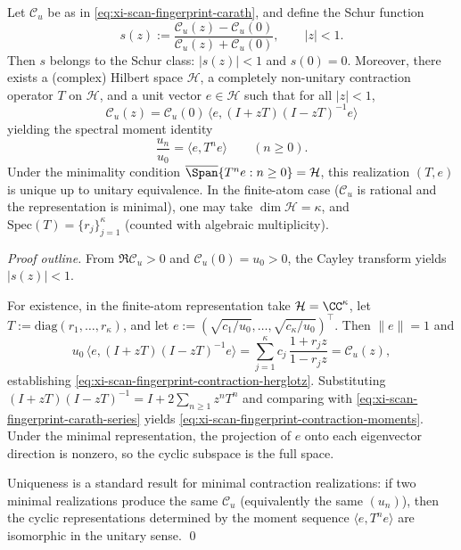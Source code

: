 \begin{proposition}\label{prop:xi-scan-fingerprint-minimal-contraction-realization}
Let \(\mathscr{C}_u\) be as in \eqref{eq:xi-scan-fingerprint-carath}, and define the Schur function
\[
s(z):=\frac{\mathscr{C}_u(z)-\mathscr{C}_u(0)}{\mathscr{C}_u(z)+\mathscr{C}_u(0)},
\qquad |z|<1.
\]
Then \(s\) belongs to the Schur class: \(|s(z)|<1\) and \(s(0)=0\).
Moreover, there exists a (complex) Hilbert space \(\mathcal{H}\), a completely non-unitary contraction operator \(T\) on \(\mathcal{H}\), and a unit vector \(e\in\mathcal{H}\) such that for all \(|z|<1\),
\begin{equation}\label{eq:xi-scan-fingerprint-contraction-herglotz}
\boxed{\;
\mathscr{C}_u(z)=\mathscr{C}_u(0)\,\langle e,(I+zT)(I-zT)^{-1}e\rangle\;}
\end{equation}
yielding the spectral moment identity
\begin{equation}\label{eq:xi-scan-fingerprint-contraction-moments}
\boxed{\;
\frac{u_n}{u_0}=\langle e,T^{n}e\rangle\qquad(n\ge 0).\;}
\end{equation}
Under the minimality condition
\(
\overline{\Span}\{T^n e:n\ge 0\}=\mathcal{H}
\),
this realization \((T,e)\) is unique up to unitary equivalence.
In the finite-atom case (\(\mathscr{C}_u\) is rational and the representation is minimal), one may take \(\dim\mathcal{H}=\kappa\), and \(\mathrm{Spec}(T)=\{r_j\}_{j=1}^{\kappa}\) (counted with algebraic multiplicity).
\end{proposition}
\begin{proof}[Proof outline]
From \(\Re\mathscr{C}_u>0\) and \(\mathscr{C}_u(0)=u_0>0\), the Cayley transform yields \(|s(z)|<1\).
\par
For existence, in the finite-atom representation take \(\mathcal{H}=\CC^\kappa\), let \(T:=\mathrm{diag}(r_1,\dots,r_\kappa)\), and let
\(
e:=(\sqrt{c_1/u_0},\dots,\sqrt{c_\kappa/u_0})^\top
\).
Then \(\|e\|=1\) and
\[
u_0\,\langle e,(I+zT)(I-zT)^{-1}e\rangle
=\sum_{j=1}^{\kappa}c_j\,\frac{1+r_j z}{1-r_j z}
=\mathscr{C}_u(z),
\]
establishing \eqref{eq:xi-scan-fingerprint-contraction-herglotz}.
Substituting \((I+zT)(I-zT)^{-1}=I+2\sum_{n\ge 1}z^nT^n\) and comparing with \eqref{eq:xi-scan-fingerprint-carath-series} yields \eqref{eq:xi-scan-fingerprint-contraction-moments}.
Under the minimal representation, the projection of \(e\) onto each eigenvector direction is nonzero, so the cyclic subspace is the full space.
\par
Uniqueness is a standard result for minimal contraction realizations: if two minimal realizations produce the same \(\mathscr{C}_u\) (equivalently the same \((u_n)\)), then the cyclic representations determined by the moment sequence \(\langle e,T^n e\rangle\) are isomorphic in the unitary sense. \qed
\end{proof}

